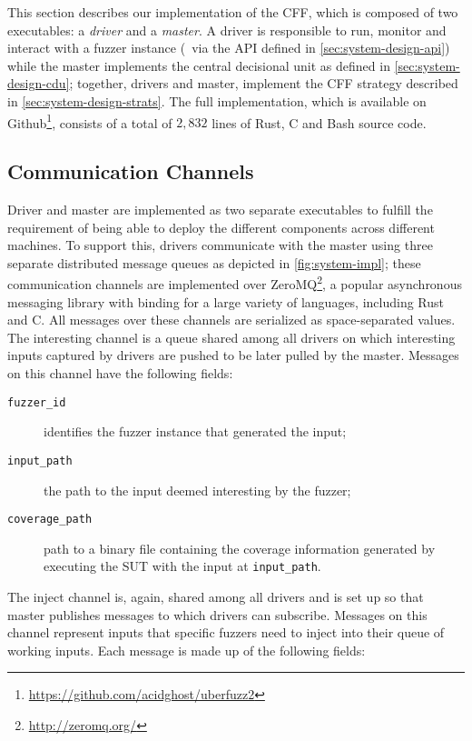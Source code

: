 This section describes our implementation of the \ac{CFF}, which is composed of
two executables: a \emph{driver} and a \emph{master}. A driver is responsible to
run, monitor and interact with a fuzzer instance (\ie~via the \ac{API} defined
in \autoref{sec:system-design-api}) while the master implements the central
decisional unit as defined in \autoref{sec:system-design-cdu}; together,
drivers and master, implement the \ac{CFF} strategy described in
\autoref{sec:system-design-strats}. The full implementation, which is
available on Github\footnote{\url{https://github.com/acidghost/uberfuzz2}},
consists of a total of $2,832$ lines of Rust, C and Bash source code.

\subsection{Communication Channels}
Driver and master are implemented as two separate executables to fulfill the
requirement of being able to deploy the different components across different
machines. To support this, drivers communicate with the master using three
separate distributed message queues as depicted in \autoref{fig:system-impl};
these communication channels are implemented over
ZeroMQ\footnote{\url{http://zeromq.org/}}, a popular asynchronous messaging
library with binding for a large variety of languages, including Rust and C. All
messages over these channels are serialized as space-separated values. The
interesting channel is a queue shared among all drivers on which interesting
inputs captured by drivers are pushed to be later pulled by the master. Messages
on this channel have the following fields:

\begin{description}
    \item[\texttt{fuzzer\_id}] identifies the fuzzer instance that generated the
        input;
    \item[\texttt{input\_path}] the path to the input deemed interesting by the
        fuzzer;
    \item[\texttt{coverage\_path}] path to a binary file containing the coverage
        information generated by executing the \ac{SUT} with the input at
        \texttt{input\_path}.
\end{description}

The inject channel is, again, shared among all drivers and is set up so that
master publishes messages to which drivers can subscribe. Messages on this
channel represent inputs that specific fuzzers need to inject into their queue
of working inputs. Each message is made up of the following fields:

